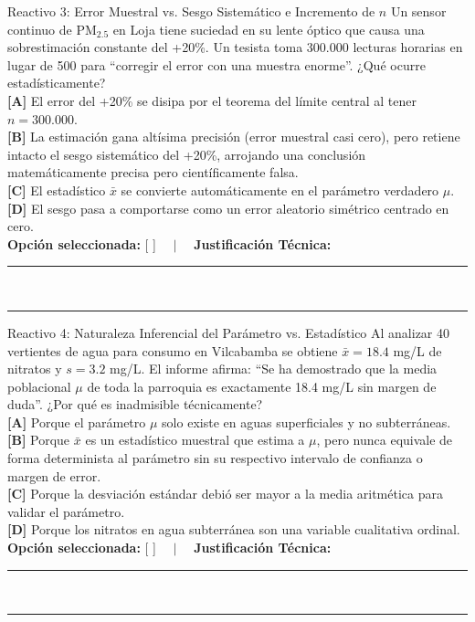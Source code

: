 \documentclass[11pt,a4paper]{article}
\begin{document}
\begin{reactivobox}{Reactivo 3: Error Muestral vs. Sesgo Sistemático e Incremento de $n$}
Un sensor continuo de PM$_{2.5}$ en Loja tiene suciedad en su lente óptico que causa una sobrestimación constante del +20\%. Un tesista toma 300.000 lecturas horarias en lugar de 500 para ``corregir el error con una muestra enorme''. ¿Qué ocurre estadísticamente?\\
\textbf{[A]} El error del +20\% se disipa por el teorema del límite central al tener $n = 300.000$.\\
\textbf{[B]} La estimación gana altísima precisión (error muestral casi cero), pero retiene intacto el sesgo sistemático del +20\%, arrojando una conclusión matemáticamente precisa pero científicamente falsa.\\
\textbf{[C]} El estadístico $\bar{x}$ se convierte automáticamente en el parámetro verdadero $\mu$.\\
\textbf{[D]} El sesgo pasa a comportarse como un error aleatorio simétrico centrado en cero.\\[4pt]
\textbf{Opción seleccionada:} [ \quad ] $\quad \vert \quad$ \textbf{Justificación Técnica:}\\
\rule{\linewidth}{0.4pt}\\[2pt]
\rule{\linewidth}{0.4pt}
\end{reactivobox}

\begin{reactivobox}{Reactivo 4: Naturaleza Inferencial del Parámetro vs. Estadístico}
Al analizar 40 vertientes de agua para consumo en Vilcabamba se obtiene $\bar{x} = 18.4$ mg/L de nitratos y $s = 3.2$ mg/L. El informe afirma: ``Se ha demostrado que la media poblacional $\mu$ de toda la parroquia es exactamente 18.4 mg/L sin margen de duda''. ¿Por qué es inadmisible técnicamente?\\
\textbf{[A]} Porque el parámetro $\mu$ solo existe en aguas superficiales y no subterráneas.\\
\textbf{[B]} Porque $\bar{x}$ es un estadístico muestral que estima a $\mu$, pero nunca equivale de forma determinista al parámetro sin su respectivo intervalo de confianza o margen de error.\\
\textbf{[C]} Porque la desviación estándar debió ser mayor a la media aritmética para validar el parámetro.\\
\textbf{[D]} Porque los nitratos en agua subterránea son una variable cualitativa ordinal.\\[4pt]
\textbf{Opción seleccionada:} [ \quad ] $\quad \vert \quad$ \textbf{Justificación Técnica:}\\
\rule{\linewidth}{0.4pt}\\[2pt]
\rule{\linewidth}{0.4pt}
\end{reactivobox}
\end{document}
